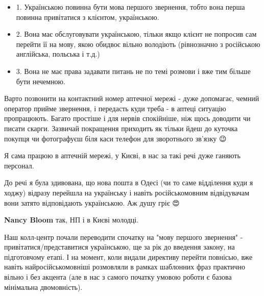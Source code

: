 \begin{itemize}
\begin{itemize}
\item 1. Українською повинна бути мова першого звернення, тобто вона перша повинна
привітатися з клієнтом, українською.

\item 2. Вона має обслуговувати українською, тільки якщо клієнт не попросив сам
перейти її на мову, якою обидвоє вільно володіють (рівнозначно з російською
англійська, польська і т.д.)

\item 3. Вона не має права задавати питань не по темі розмови і вже тим більше бути
нечемною.
\end{itemize}

Варто позвонити на контактний номер аптечної мережі - дуже допомагає, чемний
оператор прийме звернення, і передасть куди треба - в аптеці ситуацію
пропрацюють. Багато простіше і для нервів спокійніше, ніж щось доводити чи
писати скарги. Зазвичай покращення приходить як тільки йдеш до куточка покупця
чи фотографуєш біля каси телефон для зворотнього зв'язку 😉

Я сама працюю в аптечній мережі, у Києві, в нас за такі речі дуже ганяють
персонал.

\begin{itemize}
 

До речі я була здивована, що нова пошта в Одесі (чи то саме відділення куди я
ходжу) відразу перейшла на українську і навіть російськомовним відвідувачам
вони затято відповідають українською. Аж душу гріє 😍


 
\textbf{Nancy Bloom} так, НП і в Києві молодці.

Наш колл-центр почали переводити спочатку на "мову першого звернення" -
привітатися/представитися українською, ще за рік до введення закону, на
підготовчому етапі. І на момент, коли видали директиву перейти повнісью, вже
навіть найросійськомовніші розмовляли в рамках шаблонних фраз практично вільно
і без акцента (але в нас з самого початку умовою роботи є базова мінімальна
двомовність).


\end{itemize}
\end{itemize}
